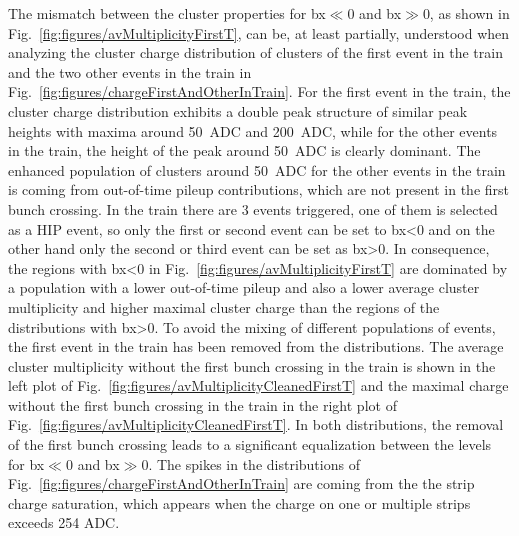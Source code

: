 The mismatch between the cluster properties for bx$\ll$0 and bx$\gg$0, as shown in Fig.~\ref{fig:figures/avMultiplicityFirstT}, can be, at least partially, understood when analyzing the cluster charge distribution of clusters of the first event in the train and the two other events in the train in Fig.~\ref{fig:figures/chargeFirstAndOtherInTrain}. For the first event in the train, the cluster charge distribution exhibits a double peak structure of similar peak heights with maxima around 50~ADC and 200~ADC, while for the other events in the train, the height of the peak around 50~ADC is clearly dominant. The enhanced population of clusters around 50~ADC for the other events in the train is coming from out-of-time pileup contributions, which are not present in the first bunch crossing. In the train there are 3 events triggered, one of them is selected as a HIP event, so only the first or second event can be set to bx<0 and on the other hand only the second or third event can be set as bx>0. In consequence, the regions with bx<0 in Fig.~\ref{fig:figures/avMultiplicityFirstT} are dominated by a population with a lower out-of-time pileup and also a lower average cluster multiplicity and higher maximal cluster charge than the regions of the distributions with bx>0. To avoid the mixing of different populations of events, the first event in the train has been removed from the distributions. The average cluster multiplicity without the first bunch crossing in the train is shown in the left plot of Fig.~\ref{fig:figures/avMultiplicityCleanedFirstT} and the maximal charge without the first bunch crossing in the train in the right plot of Fig.~\ref{fig:figures/avMultiplicityCleanedFirstT}. In both distributions, the removal of the first bunch crossing leads to a significant equalization between the levels for bx$\ll$0 and bx$\gg$0. The spikes in the distributions of Fig.~\ref{fig:figures/chargeFirstAndOtherInTrain} are coming from the the strip charge saturation, which appears when the charge on one or multiple strips exceeds 254 ADC.

